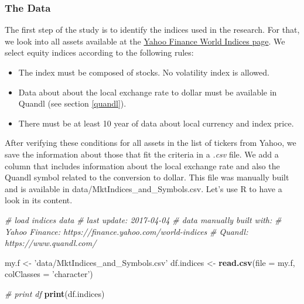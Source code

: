 \documentclass[11pt,]{book}
\newenvironment{Shaded}{\begin{snugshade}}{\end{snugshade}}
\newcommand{\KeywordTok}[1]{\textcolor[rgb]{0.27,0.27,0.27}{\textbf{#1}}}
\newcommand{\DataTypeTok}[1]{\textcolor[rgb]{0.27,0.27,0.27}{#1}}
\newcommand{\StringTok}[1]{\textcolor[rgb]{0.5,0.5,0.5}{#1}}
\newcommand{\CommentTok}[1]{\textcolor[rgb]{0.56,0.35,0.01}{\textit{#1}}}
\newcommand{\NormalTok}[1]{#1}
\providecommand{\tightlist}{%
  \setlength{\itemsep}{0pt}\setlength{\parskip}{0pt}}
\begin{document}
\subsubsection{The Data}\label{the-data}

The first step of the study is to identify the indices used in the
research. For that, we look into all assets available at the
\href{https://finance.yahoo.com/world-indices}{Yahoo Finance World
Indices page}. We select equity indices according to the following
rules:

\begin{itemize}
\tightlist
\item
  The index must be composed of stocks. No volatility index is allowed.
\item
  Data about about the local exchange rate to dollar must be available
  in Quandl (see section \ref{quandl}).
\item
  There must be at least 10 year of data about local currency and index
  price.
\end{itemize}

After verifying these conditions for all assets in the list of tickers
from Yahoo, we save the information about those that fit the criteria in
a \emph{.csv} file. We add a column that includes information about the
local exchange rate and also the Quandl symbol related to the conversion
to dollar. This file was manually built and is available in
data/MktIndices\_and\_Symbols.csv. Let's use R to have a look in its
content.

\begin{Shaded}
\begin{Highlighting}[]
\CommentTok{# load indices data}
\CommentTok{# last update: 2017-04-04}
\CommentTok{# data manually built with:}
\CommentTok{#   Yahoo Finance: https://finance.yahoo.com/world-indices}
\CommentTok{#   Quandl: https://www.quandl.com/}

\NormalTok{my.f <-}\StringTok{ 'data/MktIndices_and_Symbols.csv'}
\NormalTok{df.indices <-}\StringTok{ }\KeywordTok{read.csv}\NormalTok{(}\DataTypeTok{file =}\NormalTok{ my.f, }\DataTypeTok{colClasses =} \StringTok{'character'}\NormalTok{)}

\CommentTok{# print df}
\KeywordTok{print}\NormalTok{(df.indices)}
\end{Highlighting}
\end{Shaded}
\end{document}
